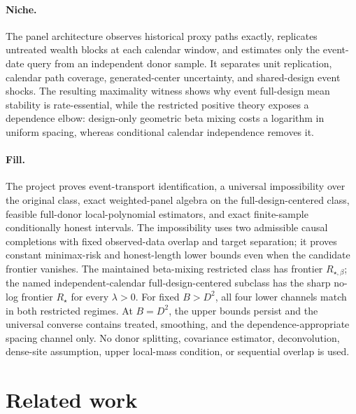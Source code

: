 \documentclass{article}
\begin{document}
\paragraph{Niche.} The panel architecture observes historical proxy paths exactly, replicates untreated wealth blocks at each calendar window, and estimates only the event-date query from an independent donor sample.  It separates unit replication, calendar path coverage, generated-center uncertainty, and shared-design event shocks.  The resulting maximality witness shows why event full-design mean stability is rate-essential, while the restricted positive theory exposes a dependence elbow: design-only geometric beta mixing costs a logarithm in uniform spacing, whereas conditional calendar independence removes it.

\paragraph{Fill.} The project proves event-transport identification, a universal impossibility over the original class, exact weighted-panel algebra on the full-design-centered class, feasible full-donor local-polynomial estimators, and exact finite-sample conditionally honest intervals.  The impossibility uses two admissible causal completions with fixed observed-data overlap and target separation; it proves constant minimax-risk and honest-length lower bounds even when the candidate frontier vanishes.  The maintained beta-mixing restricted class has frontier \(R_{\star,\beta}\); the named independent-calendar full-design-centered subclass has the sharp no-log frontier \(R_\star\) for every \(\lambda>0\).  For fixed \(B>D^2\), all four lower channels match in both restricted regimes.  At \(B=D^2\), the upper bounds persist and the universal converse contains treated, smoothing, and the dependence-appropriate spacing channel only.  No donor splitting, covariance estimator, deconvolution, dense-site assumption, upper local-mass condition, or sequential overlap is used.

\section{Related work}
\end{document}
